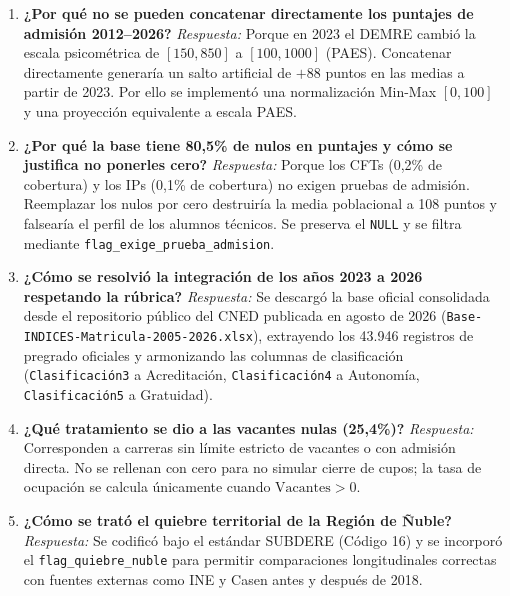 \documentclass[11pt,a4paper]{article}
\begin{document}
\begin{enumerate}
    \item \textbf{¿Por qué no se pueden concatenar directamente los puntajes de admisión 2012--2026?}
    \newline \textit{Respuesta:} Porque en 2023 el DEMRE cambió la escala psicométrica de $[150, 850]$ a $[100, 1000]$ (PAES). Concatenar directamente generaría un salto artificial de $+88$ puntos en las medias a partir de 2023. Por ello se implementó una normalización Min-Max $[0, 100]$ y una proyección equivalente a escala PAES.

    \item \textbf{¿Por qué la base tiene 80,5\% de nulos en puntajes y cómo se justifica no ponerles cero?}
    \newline \textit{Respuesta:} Porque los CFTs (0,2\% de cobertura) y los IPs (0,1\% de cobertura) no exigen pruebas de admisión. Reemplazar los nulos por cero destruiría la media poblacional a 108 puntos y falsearía el perfil de los alumnos técnicos. Se preserva el \texttt{NULL} y se filtra mediante \texttt{flag\_exige\_prueba\_admision}.

    \item \textbf{¿Cómo se resolvió la integración de los años 2023 a 2026 respetando la rúbrica?}
    \newline \textit{Respuesta:} Se descargó la base oficial consolidada desde el repositorio público del CNED publicada en agosto de 2026 (\texttt{Base-INDICES-Matricula-2005-2026.xlsx}), extrayendo los 43.946 registros de pregrado oficiales y armonizando las columnas de clasificación (\texttt{Clasificación3} a Acreditación, \texttt{Clasificación4} a Autonomía, \texttt{Clasificación5} a Gratuidad).

    \item \textbf{¿Qué tratamiento se dio a las vacantes nulas (25,4\%)?}
    \newline \textit{Respuesta:} Corresponden a carreras sin límite estricto de vacantes o con admisión directa. No se rellenan con cero para no simular cierre de cupos; la tasa de ocupación se calcula únicamente cuando $\text{Vacantes} > 0$.

    \item \textbf{¿Cómo se trató el quiebre territorial de la Región de Ñuble?}
    \newline \textit{Respuesta:} Se codificó bajo el estándar SUBDERE (Código 16) y se incorporó el \texttt{flag\_quiebre\_nuble} para permitir comparaciones longitudinales correctas con fuentes externas como INE y Casen antes y después de 2018.
\end{enumerate}
\end{document}
